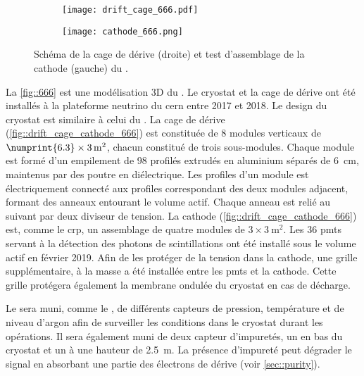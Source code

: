       \begin{figure}[htbp]
        \begin{subfigure}{0.48\textwidth}
          \centering
          \texttt{[image: drift\_cage\_666.pdf]}
        \end{subfigure}\hfill
        \begin{subfigure}{0.48\textwidth}
          \centering
          \texttt{[image: cathode\_666.png]}
        \end{subfigure}
        \caption[Cathode et cage de dérive du \SSS{}]{\label{fig::drift_cage_cathode_666}Schéma de la cage de dérive (droite) et test d'assemblage de la cathode (gauche) du \SSS{}.}
      \end{figure}

      La \autoref{fig::666} est une modélisation 3D du \SSS{}. Le cryostat et la cage de dérive ont été installés à la plateforme neutrino du \gls{cern} entre 2017 et 2018. Le design du cryostat est similaire à celui du \TOO{}. La cage de dérive (\autoref{fig::drift_cage_cathode_666}) est constituée de 8 modules verticaux de $\numprint{6.3}\times\SI{3}{\meter\squared}$, chacun constitué de trois sous-modules. Chaque module est formé d'un empilement de 98 profilés extrudés en aluminium séparés de \SI{6}{\centi\meter}, maintenus par des poutre en diélectrique. Les profiles d'un module est électriquement connecté aux profiles correspondant des deux modules adjacent, formant des anneaux entourant le volume actif. Chaque anneau est relié au suivant par deux diviseur de tension. La cathode (\autoref{fig::drift_cage_cathode_666}) est, comme le \gls{crp}, un assemblage de quatre modules de $3\times\SI{3}{\meter\squared}$. Les 36 \glspl{pmt} servant à la détection des photons de scintillations ont été installé sous le volume actif en février 2019. Afin de les protéger de la tension dans la cathode, une grille supplémentaire, à la masse a été installée entre les \glspl{pmt} et la cathode. Cette grille protégera également la membrane ondulée du cryostat en cas de décharge. 

      Le \SSS{} sera muni, comme le \TOO{}, de différents capteurs de pression, température et de niveau d'argon afin de surveiller les conditions dans le cryostat durant les opérations. Il sera également muni de deux capteur d'impuretés, un en bas du cryostat et un à une hauteur de \SI{2.5}{\meter}. La présence d'impureté peut dégrader le signal en absorbant une partie des électrons de dérive (voir \autoref{sec::purity}).

